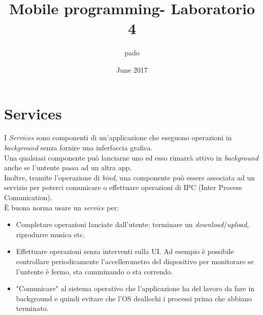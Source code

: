 \documentclass{book}
\title{Mobile programming- Laboratorio 4}
\author{pado}
\date{June 2017}
\begin{document}
\maketitle

\chapter{Services}

I \textit{Services} sono componenti di un'applicazione che eseguono operazioni in \textit{background} senza fornire una inferfaccia grafica. \\
Una qualsiasi componente può lanciarne uno ed esso rimarrà attivo in \textit{background} anche se l'untente passa ad un altra app.\\
Inoltre, tramite l'operazione di \textit{bind}, una componente può essere associata ad un servizio per poterci comunicare o effettuare operazioni di IPC (Inter Process Comunication).\\
È buona norma usare un \textit{service} per:
\begin{itemize}
	\item Completare operazioni lanciate dall'utente: terminare un \textit{download}/\textit{upload}, riprodurre musica etc.
	\item Effettuare operazioni senza interventi sulla UI. Ad esempio è possibile controllare periodicamente l'accellerometro del dispositivo per monitorare se l'untente è fermo, sta camminando o sta correndo.
	\item "Comunicare" al sistema operativo che l'applicazione ha del lavoro da fare in background e quindi evitare che l'OS deallochi i processi prima che abbiano terminato.
\end{itemize}
\end{document}
